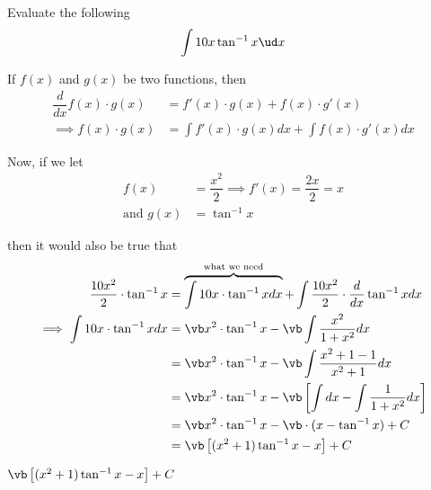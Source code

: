 

\DIVIDE{}\vb

\question[2] Evaluate the following 
  \[ \int \va x\tan^{-1}x\ud x \]

\watchout

\begin{solution}[\halfpage]
  If $f(x)$ and $g(x)$ be two functions, then 
  \begin{align}
    \dfrac{d}{dx}f(x)\cdot g(x) &= f'(x)\cdot g(x) + f(x)\cdot g'(x) \\
    \implies f(x)\cdot g(x) &= \int f'(x)\cdot g(x) dx + \int f(x)\cdot g'(x) dx
  \end{align} 

  Now, if we let 
  \begin{align}
    f(x) &= \dfrac{x^2}{2}\implies f'(x) = \dfrac{2x}{2} = x \\
    \text{and } g(x) &= \tan^{-1} x
  \end{align}

  then it would also be true that 
  \begin{align}
    \dfrac{\va x^2}{2}\cdot\tan^{-1}x &= \overbrace{\int \va x\cdot\tan^{-1} x dx}^{\text{what we need}} 
          + \int\dfrac{\va x^2}{2}\cdot\dfrac{d}{dx}\tan^{-1}x dx \\
    \implies \int \va x\cdot\tan^{-1}x dx &= \vb x^2\cdot\tan^{-1}x - \vb\int\dfrac{x^2}{1+x^2} dx \\
        &= \vb x^2\cdot\tan^{-1}x 
          -\vb\int\dfrac{x^2+1-1}{x^2 + 1} dx \\
        &= \vb x^2\cdot\tan^{-1}x 
        - \vb\left[ \int dx - \int\dfrac{1}{1+x^2} dx \right] \\
        &= \vb x^2\cdot\tan^{-1} x -\vb\cdot(x-\tan^{-1}x) + C \\
        &= \vb\left[ (x^2+1)\tan^{-1}x -x \right] + C 
  \end{align}
\end{solution}

\ifprintanswers
  \begin{codex}
    $\vb\left[ (x^2+1)\tan^{-1}x -x \right] + C$
  \end{codex}
\fi
